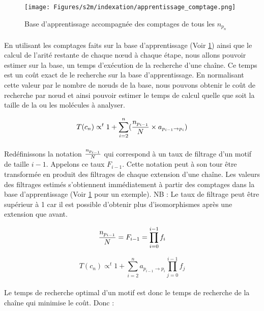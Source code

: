 \documentclass[12pt,french,twoside]{report}
\begin{document}
\begin{figure}
  \texttt{[image: Figures/s2m/indexation/apprentissage\_comptage.png]}
  \caption{\label{app_compt}Base d'apprentissage accompagnée des comptages de tous les $n_{p_{n}}$}
\end{figure}

\paragraph{}En utilisant les comptages faits sur la base d'apprentissage (Voir \ref{app_compt}) ainsi que le calcul de l'arité
restante de chaque n\oe{}ud à chaque étape, nous allons pouvoir estimer sur la base, un temps d'exécution de la recherche d'une
chaîne. Ce temps est un coût exact de le recherche sur la base d'apprentissage. En normalisant cette valeur par le nombre de
n\oe{}uds de la base, nous pouvons obtenir le coût de recherche par n\oe{}ud et ainsi pouvoir estimer le temps de calcul quelle que soit
la taille de la ou les molécules à analyser.

\begin{equation}
 T(c_n) \propto^t 1 + \sum_{i=2}^n ({n_{p_{i-1}} \over N} \times a_{p_{i-1} \rightarrow p_i})
\end{equation}

\paragraph{}Redéfinissons la notation ${n_{p_{i-1}} \over N}$ qui correspond à un taux de filtrage d'un motif de taille $i-1$.
Appelons ce taux $F_{i-1}$. Cette notation peut à son tour être transformée en
produit des filtrages de chaque extension d'une chaîne. Les valeurs des filtrages estimés s'obtiennent immédiatement à partir des
comptages dans la base d'apprentissage (Voir \ref{app_compt} pour un exemple). NB : Le taux de filtrage peut être supérieur à 1
car il est possible d'obtenir plus d'isomorphismes après une extension que avant.

\begin{equation}
 {n_{p_{i-1}} \over N} = F_{i-1} = \prod_{i=0}^{i-1} f_i
\end{equation}

\begin{equation}
 T(c_n) \propto^t 1 + \sum_{i=2}^n a_{p_{i-1} \rightarrow p_i} \prod_{j=0}^{i-1} f_j
\end{equation}

\paragraph{}Le temps de recherche optimal d'un motif est donc le temps de recherche de la chaîne qui minimise le coût. Donc :
\end{document}
